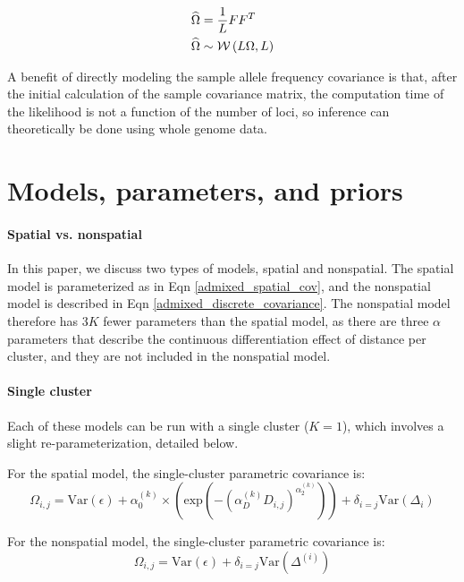 \documentclass[12pt]{article}
\begin{document}
\begin{align}
\widehat{\Omega} &= \frac{1}{L}FF^T \notag \\
\widehat{\Omega} &\sim \mathcal{W}\left( L\Omega, L	\right)
\label{wishart}
\end{align}

A benefit of directly modeling the sample allele frequency covariance is that, 
after the initial calculation of the sample covariance matrix,
the computation time of the likelihood is not a function of the number of loci,
so inference can theoretically be done using whole genome data.

\section{Models, parameters, and priors}
\paragraph{Spatial vs. nonspatial}
In this paper, we discuss two types of models, spatial and nonspatial.
The spatial model is parameterized as in Eqn \ref{admixed_spatial_cov},
and the nonspatial model is described in Eqn \ref{admixed_discrete_covariance}.
The nonspatial model therefore has $3K$ fewer parameters than the spatial model,
as there are three $\alpha$ parameters that describe the continuous differentiation effect of distance per cluster,
and they are not included in the nonspatial model.

\paragraph{Single cluster}
Each of these models can be run with a single cluster ($K=1$), 
which involves a slight re-parameterization, detailed below.

For the spatial model, the single-cluster parametric covariance is:
\begin{equation}
\Omega_{i,j} = \text{Var}(\epsilon) + 
\alpha^{(k)}_0 \times \left(\text{exp} \left(  -(\alpha^{(k)}_D D_{i,j})^{\alpha^{(k)}_2}\right) \right)	 +
\delta_{i=j} \text{Var}(\Delta_i)
\label{admixed_spatial_cov}
\end{equation}

For the nonspatial model, the single-cluster parametric covariance is:
\begin{equation}
\Omega_{i,j} = \text{Var}(\epsilon) + \delta_{i=j} \text{Var}(\Delta^{(i)})
\label{admixed_discrete_covariance}
\end{equation}
\end{document}
